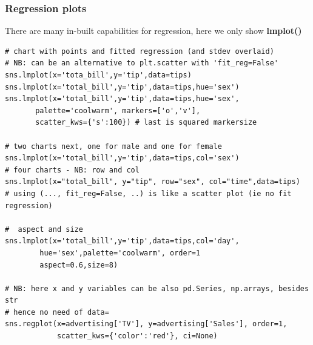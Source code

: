 \documentclass[11pt]{article}
\begin{document}
\subsubsection{Regression plots}
There are many in-built capabilities for regression, here we only show \textbf{lmplot()}
\begin{lstlisting}
# chart with points and fitted regression (and stdev overlaid)
# NB: can be an alternative to plt.scatter with 'fit_reg=False'
sns.lmplot(x='tota_bill',y='tip',data=tips)
sns.lmplot(x='total_bill',y='tip',data=tips,hue='sex')
sns.lmplot(x='total_bill',y='tip',data=tips,hue='sex',
       palette='coolwarm', markers=['o','v'],
       scatter_kws={'s':100}) # last is squared markersize

# two charts next, one for male and one for female
sns.lmplot(x='total_bill',y='tip',data=tips,col='sex')
# four charts - NB: row and col
sns.lmplot(x="total_bill", y="tip", row="sex", col="time",data=tips)
# using (..., fit_reg=False, ..) is like a scatter plot (ie no fit regression)

#  aspect and size
sns.lmplot(x='total_bill',y='tip',data=tips,col='day',
		hue='sex',palette='coolwarm', order=1
        aspect=0.6,size=8)
        
# NB: here x and y variables can be also pd.Series, np.arrays, besides str
# hence no need of data=
sns.regplot(x=advertising['TV'], y=advertising['Sales'], order=1,
            scatter_kws={'color':'red'}, ci=None) 
\end{lstlisting}

\end{document}
